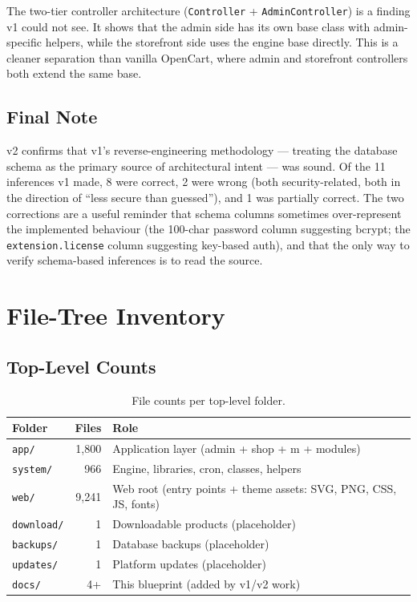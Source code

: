 \documentclass[11pt,a4paper]{article}
\begin{document}
The two-tier controller architecture (\texttt{Controller} +
\texttt{AdminController}) is a finding v1 could not see. It shows
that the admin side has its own base class with admin-specific
helpers, while the storefront side uses the engine base directly.
This is a cleaner separation than vanilla OpenCart, where admin
and storefront controllers both extend the same base.

\subsection{Final Note}

v2 confirms that v1's reverse-engineering methodology --- treating
the database schema as the primary source of architectural intent
--- was sound. Of the 11 inferences v1 made, 8 were correct, 2
were wrong (both security-related, both in the direction of ``less
secure than guessed''), and 1 was partially correct. The two
corrections are a useful reminder that schema columns sometimes
over-represent the implemented behaviour (the 100-char password
column suggesting bcrypt; the \texttt{extension.license} column
suggesting key-based auth), and that the only way to verify
schema-based inferences is to read the source.

\appendix

\section{File-Tree Inventory}\label{app:files}

\subsection{Top-Level Counts}

\begin{table}[htbp]
\centering
\caption{File counts per top-level folder.}\label{tab:file-counts}
\small
\begin{tabularx}{\columnwidth}{lrX}
\toprule
\textbf{Folder} & \textbf{Files} & \textbf{Role} \\
\midrule
\texttt{app/}     & 1,800  & Application layer (admin + shop + m + modules) \\
\texttt{system/}  & 966    & Engine, libraries, cron, classes, helpers \\
\texttt{web/}     & 9,241  & Web root (entry points + theme assets: SVG, PNG, CSS, JS, fonts) \\
\texttt{download/} & 1     & Downloadable products (placeholder) \\
\texttt{backups/} & 1      & Database backups (placeholder) \\
\texttt{updates/} & 1      & Platform updates (placeholder) \\
\texttt{docs/}    & 4+     & This blueprint (added by v1/v2 work) \\
\bottomrule
\end{tabularx}
\end{table}
\end{document}
